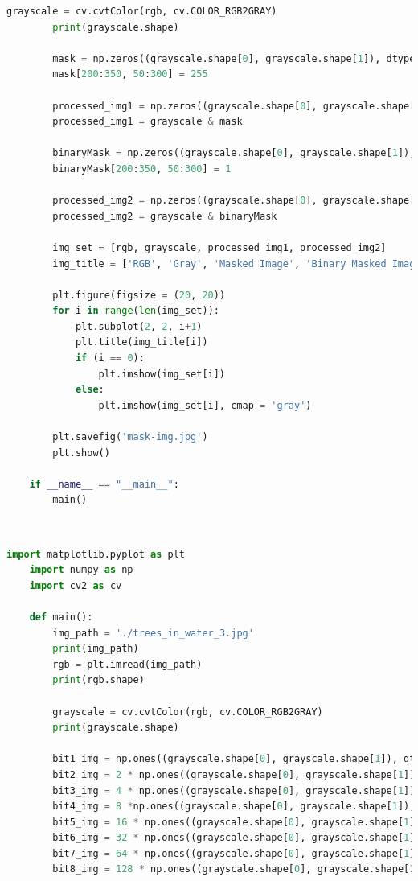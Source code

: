 \documentclass{article}
\begin{document}
{\begin{lstlisting}[language=Python, caption=Code for binary masking a grayscale image]
        grayscale = cv.cvtColor(rgb, cv.COLOR_RGB2GRAY)
        print(grayscale.shape)
    
        mask = np.zeros((grayscale.shape[0], grayscale.shape[1]), dtype = np.uint8)
        mask[200:350, 50:300] = 255
    
        processed_img1 = np.zeros((grayscale.shape[0], grayscale.shape[1]), dtype = np.uint8)
        processed_img1 = grayscale & mask
        
        binaryMask = np.zeros((grayscale.shape[0], grayscale.shape[1]), dtype = np.uint8)
        binaryMask[200:350, 50:300] = 1
    
        processed_img2 = np.zeros((grayscale.shape[0], grayscale.shape[1]), dtype = np.uint8)
        processed_img2 = grayscale & binaryMask
    
        img_set = [rgb, grayscale, processed_img1, processed_img2]
        img_title = ['RGB', 'Gray', 'Masked Image', 'Binary Masked Image']
    
        plt.figure(figsize = (20, 20))
        for i in range(len(img_set)):
            plt.subplot(2, 2, i+1)
            plt.title(img_title[i])
            if (i == 0):
                plt.imshow(img_set[i])
            else:
                plt.imshow(img_set[i], cmap = 'gray')
    
        plt.savefig('mask-img.jpg')
        plt.show()
    
    if __name__ == "__main__":
        main()

    \end{lstlisting}
    \\
    \lstset{style=mystyle}
    \begin{lstlisting}[language=Python, caption=Code for bit slicing a grayscale image]
    import matplotlib.pyplot as plt
    import numpy as np
    import cv2 as cv
    
    def main():
        img_path = './trees_in_water_3.jpg'
        print(img_path)
        rgb = plt.imread(img_path)
        print(rgb.shape)
    
        grayscale = cv.cvtColor(rgb, cv.COLOR_RGB2GRAY)
        print(grayscale.shape)
    
        bit1_img = np.ones((grayscale.shape[0], grayscale.shape[1]), dtype = np.uint8)
        bit2_img = 2 * np.ones((grayscale.shape[0], grayscale.shape[1]), dtype = np.uint8)
        bit3_img = 4 * np.ones((grayscale.shape[0], grayscale.shape[1]), dtype = np.uint8)
        bit4_img = 8 *np.ones((grayscale.shape[0], grayscale.shape[1]), dtype = np.uint8)
        bit5_img = 16 * np.ones((grayscale.shape[0], grayscale.shape[1]), dtype = np.uint8)
        bit6_img = 32 * np.ones((grayscale.shape[0], grayscale.shape[1]), dtype = np.uint8)
        bit7_img = 64 * np.ones((grayscale.shape[0], grayscale.shape[1]), dtype = np.uint8)
        bit8_img = 128 * np.ones((grayscale.shape[0], grayscale.shape[1]), dtype = np.uint8)
            

\end{lstlisting}}
\end{document}
